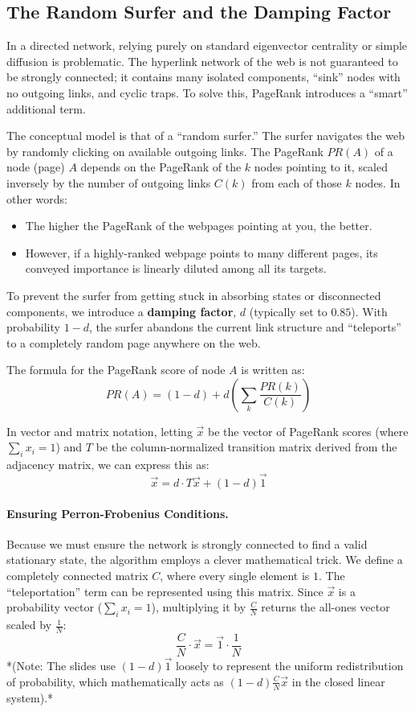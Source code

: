 \subsection{The Random Surfer and the Damping Factor}

In a directed network, relying purely on standard eigenvector centrality or simple diffusion is problematic. The hyperlink network of the web is not guaranteed to be strongly connected; it contains many isolated components, ``sink'' nodes with no outgoing links, and cyclic traps. To solve this, PageRank introduces a ``smart'' additional term.

The conceptual model is that of a ``random surfer.'' The surfer navigates the web by randomly clicking on available outgoing links. The PageRank $PR(A)$ of a node (page) $A$ depends on the PageRank of the $k$ nodes pointing to it, scaled inversely by the number of outgoing links $C(k)$ from each of those $k$ nodes. In other words:
\begin{itemize}
    \item The higher the PageRank of the webpages pointing at you, the better.
    \item However, if a highly-ranked webpage points to many different pages, its conveyed importance is linearly diluted among all its targets.
\end{itemize}

To prevent the surfer from getting stuck in absorbing states or disconnected components, we introduce a \textbf{damping factor}, $d$ (typically set to $0.85$). With probability $1-d$, the surfer abandons the current link structure and ``teleports'' to a completely random page anywhere on the web.

The formula for the PageRank score of node $A$ is written as:
\[
    PR(A) = (1 - d) + d \left( \sum_{k} \frac{PR(k)}{C(k)} \right)
\]

In vector and matrix notation, letting $\vec{x}$ be the vector of PageRank scores (where $\sum_i x_i = 1$) and $T$ be the column-normalized transition matrix derived from the adjacency matrix, we can express this as:
\[
    \vec{x} = d \cdot T\vec{x} + (1 - d)\vec{1}
\]

\paragraph{Ensuring Perron-Frobenius Conditions.}
Because we must ensure the network is strongly connected to find a valid stationary state, the algorithm employs a clever mathematical trick. We define a completely connected matrix $C$, where every single element is $1$. The ``teleportation'' term can be represented using this matrix. Since $\vec{x}$ is a probability vector ($\sum_i x_i = 1$), multiplying it by $\frac{C}{N}$ returns the all-ones vector scaled by $\frac{1}{N}$:
\[
    \frac{C}{N} \cdot \vec{x} = \vec{1} \cdot \frac{1}{N}
\]
*(Note: The slides use $(1-d)\vec{1}$ loosely to represent the uniform redistribution of probability, which mathematically acts as $(1-d)\frac{C}{N}\vec{x}$ in the closed linear system).*

